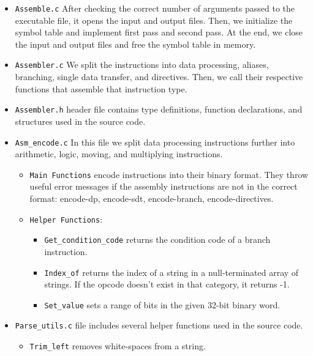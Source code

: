\documentclass[11pt]{article}
\begin{document}
\begin{itemize}
    
    \item \verb|Assemble.c|  After checking the correct number of arguments passed to the executable file, it opens the input and output files. Then, we initialize the symbol table and implement first pass and second pass. At the end, we close the input and output files and free the symbol table in memory.
    
    \item \verb|Assembler.c| We split the instructions into data processing, aliases, branching, single data transfer, and directives. Then, we call their respective functions that assemble that instruction type. 
    
    \item \verb|Assembler.h| header file contains type definitions, function declarations, and structures used in the source code.
    
    \item \verb|Asm_encode.c| In this file we split data processing instructions further into arithmetic, logic, moving, and multiplying instructions. 
    \begin{itemize}
        \item \verb |Main Functions| encode instructions into their binary format. They throw useful error messages if the assembly instructions are not in the correct format: encode-dp, encode-sdt, encode-branch, encode-directives.
        \item \verb |Helper Functions|:
        \begin{itemize}
        \item \verb|Get_condition_code| returns the condition code of a branch instruction.
        
        \item \verb|Index_of| returns the index of a string in a null-terminated array of strings. If the opcode doesn’t exist in that category, it returns -1.
        \item \verb|Set_value| sets a range of bits in the given 32-bit binary word.
        \end{itemize}
        \end{itemize}

    \item \verb|Parse_utils.c| file includes several helper functions used in the source code.
        \begin{itemize}
        
        \item \verb|Trim_left| removes white-spaces from a string.
        

\end{itemize}
\end{itemize}
\end{document}
